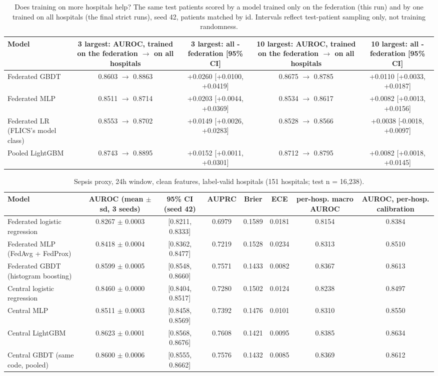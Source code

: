 \begin{table}[t]
\centering\small
\caption{Does training on more hospitals help? The same test patients scored by a model trained only on the federation (this run) and by one trained on all hospitals (the final strict runs), seed 42, patients matched by id. Intervals reflect test-patient sampling only, not training randomness.}\label{tab:flicsscale_pool}
\begin{tabular}{lcccc}
\toprule
Model & 3 largest: AUROC, trained on the federation $\rightarrow$ on all hospitals & 3 largest: all - federation [95\% CI] & 10 largest: AUROC, trained on the federation $\rightarrow$ on all hospitals & 10 largest: all - federation [95\% CI] \\
\midrule
Federated GBDT & 0.8603 $\rightarrow$ 0.8863 & +0.0260 [+0.0100, +0.0419] & 0.8675 $\rightarrow$ 0.8785 & +0.0110 [+0.0033, +0.0187] \\
Federated MLP & 0.8511 $\rightarrow$ 0.8714 & +0.0203 [+0.0044, +0.0369] & 0.8534 $\rightarrow$ 0.8617 & +0.0082 [+0.0013, +0.0156] \\
Federated LR (FLICS's model class) & 0.8553 $\rightarrow$ 0.8702 & +0.0149 [+0.0026, +0.0283] & 0.8528 $\rightarrow$ 0.8566 & +0.0038 [-0.0018, +0.0097] \\
Pooled LightGBM & 0.8743 $\rightarrow$ 0.8895 & +0.0152 [+0.0011, +0.0301] & 0.8712 $\rightarrow$ 0.8795 & +0.0082 [+0.0018, +0.0145] \\
\bottomrule
\end{tabular}
\end{table}

\begin{table}[t]
\centering\small
\caption{Sepsis proxy, 24h window, clean features, label-valid hospitals (151 hospitals; test n = 16,238).}\label{tab:sep24}
\begin{tabular}{lccccccc}
\toprule
Model & AUROC (mean $\pm$ sd, 3 seeds) & 95\% CI (seed 42) & AUPRC & Brier & ECE & per-hosp. macro AUROC & AUROC, per-hosp. calibration \\
\midrule
Federated logistic regression & 0.8267 $\pm$ 0.0003 & [0.8211, 0.8333] & 0.6979 & 0.1589 & 0.0181 & 0.8154 & 0.8384 \\
Federated MLP (FedAvg + FedProx) & 0.8418 $\pm$ 0.0004 & [0.8362, 0.8477] & 0.7219 & 0.1528 & 0.0234 & 0.8313 & 0.8510 \\
Federated GBDT (histogram boosting) & 0.8599 $\pm$ 0.0005 & [0.8548, 0.8660] & 0.7571 & 0.1433 & 0.0082 & 0.8367 & 0.8613 \\
Central logistic regression & 0.8460 $\pm$ 0.0000 & [0.8404, 0.8517] & 0.7280 & 0.1502 & 0.0124 & 0.8238 & 0.8497 \\
Central MLP & 0.8511 $\pm$ 0.0003 & [0.8458, 0.8569] & 0.7392 & 0.1476 & 0.0101 & 0.8310 & 0.8550 \\
Central LightGBM & 0.8623 $\pm$ 0.0001 & [0.8568, 0.8676] & 0.7608 & 0.1421 & 0.0095 & 0.8385 & 0.8634 \\
Central GBDT (same code, pooled) & 0.8600 $\pm$ 0.0006 & [0.8555, 0.8662] & 0.7576 & 0.1432 & 0.0085 & 0.8369 & 0.8612 \\
\bottomrule
\end{tabular}
\end{table}

